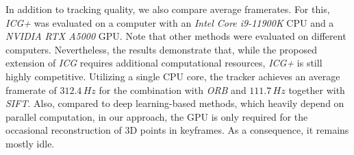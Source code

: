 \documentclass[letterpaper, 10 pt, conference]{ieeeconf}
\begin{document}
In addition to tracking quality, we also compare average framerates.
For this, \textit{ICG+} was evaluated on a computer with an \textit{Intel Core i9-11900K} CPU and a \textit{NVIDIA RTX A5000} GPU.
Note that other methods were evaluated on different computers.
Nevertheless, the results demonstrate that, while the proposed extension of \textit{ICG} requires additional computational resources, \textit{ICG+} is still highly competitive.
Utilizing a single CPU core, the tracker achieves an average framerate of $312.4\,\unit{Hz}$ for the combination with \textit{ORB} and $111.7\,\unit{Hz}$ together with \textit{SIFT}.
Also, compared to deep learning-based methods, which heavily depend on parallel computation, in our approach, the GPU is only required for the occasional reconstruction of 3D points in keyframes.
As a consequence, it remains mostly idle.
\end{document}
